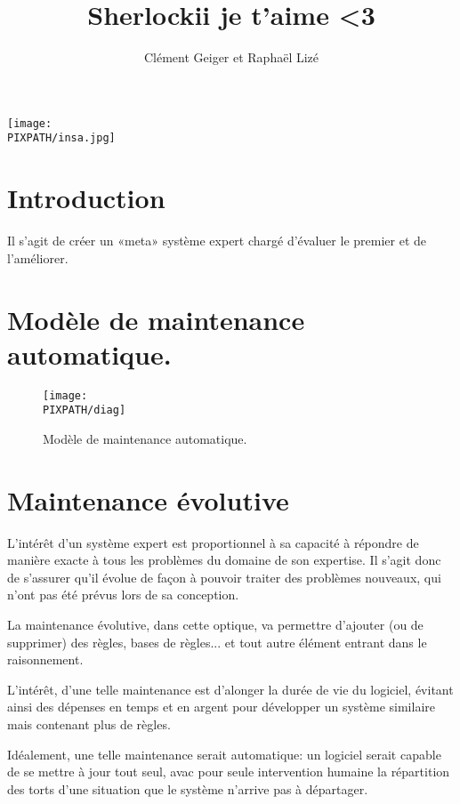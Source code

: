 \documentclass[twoside]{article}
\title{Sherlockii je t'aime <3}
\author{Clément Geiger et Raphaël Lizé}
\newcommand\PIXPATH{./docs/pics}
\begin{document}
\large
\onehalfspacing



\maketitle

\thispagestyle{empty}

\vfill

\begin{center}
\texttt{[image: \\PIXPATH/insa.jpg]}
\end{center}

\pagebreak


\section*{Introduction}
Il s'agit de créer un «meta» système expert chargé
d'évaluer le premier et de l'améliorer.


\section{Modèle de maintenance automatique.}
\begin{figure}[!h]
\begin{center}
        \texttt{[image: \\PIXPATH/diag]}
        \caption{Modèle de maintenance automatique.}
\end{center}
\end{figure}


\section{Maintenance évolutive}

L'intérêt d'un système expert est proportionnel à sa capacité à répondre
de manière exacte à tous les problèmes du domaine de son expertise. Il 
s'agit donc de s'assurer qu'il évolue de façon à pouvoir traiter des
problèmes nouveaux, qui n'ont pas été prévus lors de sa conception.

La maintenance évolutive, dans cette optique, va permettre d'ajouter (ou
de supprimer) des règles, bases de règles... et tout autre élément entrant
dans le raisonnement.

L'intérêt, d'une telle maintenance est d'alonger la durée de vie du
logiciel, évitant ainsi des dépenses en temps et en argent pour 
développer un système similaire mais contenant plus de règles.

Idéalement, une telle maintenance serait automatique: un logiciel serait
capable de se mettre à jour tout seul, avac pour seule intervention
humaine la répartition des torts d'une situation que le système n'arrive
pas à départager. 

\end{document}
